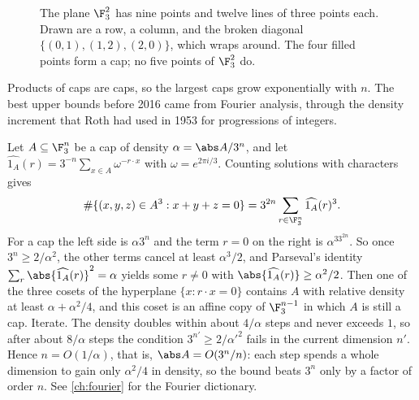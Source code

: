 \begin{refsection}
\begin{figure}[t]
\centering
{}
\caption{The plane $\F_3^2$ has nine points and twelve lines of three points each. Drawn are a row, a column, and the broken diagonal $\{(0,1),(1,2),(2,0)\}$, which wraps around. The four filled points form a cap; no five points of $\F_3^2$ do.}\label{fig:dimension:cap}
\end{figure}

Products of caps are caps, so the largest caps grow exponentially with $n$. The best upper bounds before 2016 came from Fourier analysis, through the density increment that Roth had used in 1953 for progressions of integers.

\begin{aside}
Let $A\subseteq\F_3^n$ be a cap of density $\alpha=\abs A/3^n$, and let $\widehat{1_A}(r)=3^{-n}\sum_{x\in A}\omega^{-r\cdot x}$ with $\omega=e^{2\pi i/3}$. Counting solutions with characters gives
\[
\#\{(x,y,z)\in A^3: x+y+z=0\}=3^{2n}\sum_{r\in\F_3^n}\widehat{1_A}(r)^3 .
\]
For a cap the left side is $\alpha3^n$ and the term $r=0$ on the right is $\alpha^33^{2n}$. So once $3^n\ge2/\alpha^2$, the other terms cancel at least $\alpha^3/2$, and Parseval's identity $\sum_r\abs{\widehat{1_A}(r)}^2=\alpha$ yields some $r\ne0$ with $\abs{\widehat{1_A}(r)}\ge\alpha^2/2$. Then one of the three cosets of the hyperplane $\{x:r\cdot x=0\}$ contains $A$ with relative density at least $\alpha+\alpha^2/4$, and this coset is an affine copy of $\F_3^{n-1}$ in which $A$ is still a cap. Iterate. The density doubles within about $4/\alpha$ steps and never exceeds $1$, so after about $8/\alpha$ steps the condition $3^{n'}\ge2/\alpha'^2$ fails in the current dimension $n'$. Hence $n=O(1/\alpha)$, that is, $\abs A=O(3^n/n)$: each step spends a whole dimension to gain only $\alpha^2/4$ in density, so the bound beats $3^n$ only by a factor of order $n$. See \cref{ch:fourier} for the Fourier dictionary.
\end{aside}


\end{refsection}
